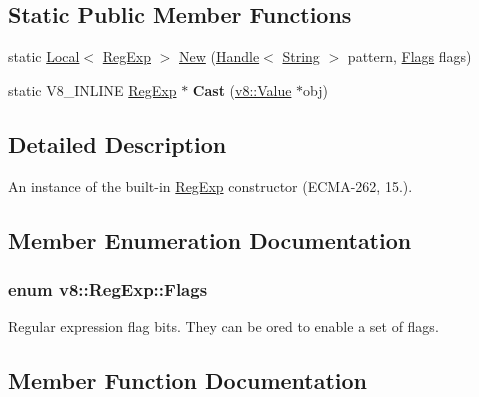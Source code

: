 \subsection*{Static Public Member Functions}
\begin{DoxyCompactItemize}
\item 
static \hyperlink{classv8_1_1Local}{Local}$<$ \hyperlink{classv8_1_1RegExp}{Reg\+Exp} $>$ \hyperlink{classv8_1_1RegExp_ac92fcff5a40cf8c698aefd021c823c2e}{New} (\hyperlink{classv8_1_1Handle}{Handle}$<$ \hyperlink{classv8_1_1String}{String} $>$ pattern, \hyperlink{classv8_1_1RegExp_aa4718a5c1f18472aff3bf51ed694fc5a}{Flags} flags)
\item 
\hypertarget{classv8_1_1RegExp_ac06d8f61c0ebb2e7292e6aeff7108f26}{}static V8\+\_\+\+I\+N\+L\+I\+N\+E \hyperlink{classv8_1_1RegExp}{Reg\+Exp} $\ast$ {\bfseries Cast} (\hyperlink{classv8_1_1Value}{v8\+::\+Value} $\ast$obj)\label{classv8_1_1RegExp_ac06d8f61c0ebb2e7292e6aeff7108f26}

\end{DoxyCompactItemize}


\subsection{Detailed Description}
An instance of the built-\/in \hyperlink{classv8_1_1RegExp}{Reg\+Exp} constructor (E\+C\+M\+A-\/262, 15.). 

\subsection{Member Enumeration Documentation}
\hypertarget{classv8_1_1RegExp_aa4718a5c1f18472aff3bf51ed694fc5a}{}
\subsubsection[{Flags}]{\setlength{\rightskip}{0pt plus 5cm}enum {\bf v8\+::\+Reg\+Exp\+::\+Flags}}\label{classv8_1_1RegExp_aa4718a5c1f18472aff3bf51ed694fc5a}
Regular expression flag bits. They can be or\textquotesingle{}ed to enable a set of flags. 

\subsection{Member Function Documentation}
\hypertarget{classv8_1_1RegExp_ad5a5e77e6e626b3c7c69eef7ba2908cc}{}
